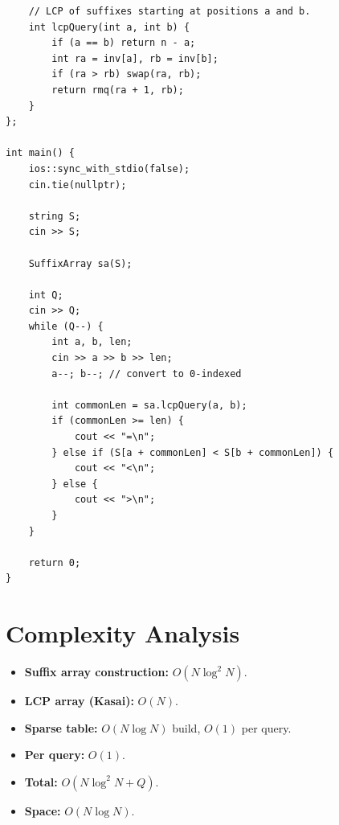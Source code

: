 \documentclass[11pt,a4paper]{article}
\begin{document}
\begin{lstlisting}
    // LCP of suffixes starting at positions a and b.
    int lcpQuery(int a, int b) {
        if (a == b) return n - a;
        int ra = inv[a], rb = inv[b];
        if (ra > rb) swap(ra, rb);
        return rmq(ra + 1, rb);
    }
};

int main() {
    ios::sync_with_stdio(false);
    cin.tie(nullptr);

    string S;
    cin >> S;

    SuffixArray sa(S);

    int Q;
    cin >> Q;
    while (Q--) {
        int a, b, len;
        cin >> a >> b >> len;
        a--; b--; // convert to 0-indexed

        int commonLen = sa.lcpQuery(a, b);
        if (commonLen >= len) {
            cout << "=\n";
        } else if (S[a + commonLen] < S[b + commonLen]) {
            cout << "<\n";
        } else {
            cout << ">\n";
        }
    }

    return 0;
}
\end{lstlisting}

\section{Complexity Analysis}
\begin{itemize}
  \item \textbf{Suffix array construction:} $O(N \log^2 N)$.
  \item \textbf{LCP array (Kasai):} $O(N)$.
  \item \textbf{Sparse table:} $O(N \log N)$ build, $O(1)$ per query.
  \item \textbf{Per query:} $O(1)$.
  \item \textbf{Total:} $O(N \log^2 N + Q)$.
  \item \textbf{Space:} $O(N \log N)$.
\end{itemize}
\end{document}
